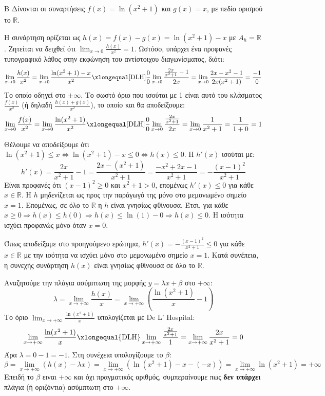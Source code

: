 \begin{thema}{Β}
Δίνονται οι συναρτήσεις $f(x) = \ln(x^2+1)$ και $g(x) = x$, με πεδίο ορισμού το $\mathbb{R}$.
\begin{erwthma}
\item Η συνάρτηση ορίζεται ως $h(x) = f(x) - g(x) = \ln(x^2+1) - x$ με $A_h = \mathbb{R}$.
Ζητείται να δειχθεί ότι $\lim_{x\to0} \frac{h(x)}{x^2} = 1$. Ωστόσο, υπάρχει ένα προφανές τυπογραφικό λάθος στην εκφώνηση του αντίστοιχου διαγωνίσματος, διότι:
\[ \lim_{x\to0} \frac{h(x)}{x^2} = \lim_{x\to0} \frac{\ln(x^2+1) - x}{x^2} \xlongequal[\text{DLH}]{\frac{0}{0}} \lim_{x\to0} \frac{\frac{2x}{x^2+1} - 1}{2x} = \lim_{x\to0} \frac{2x - x^2 - 1}{2x(x^2+1)} = \frac{-1}{0} \]
Το οποίο οδηγεί στο $\pm\infty$. Το σωστό όριο που ισούται με 1 είναι αυτό του κλάσματος $\frac{f(x)}{x^2}$ (ή δηλαδή $\frac{h(x)+g(x)}{x^2}$), το οποίο και θα αποδείξουμε:
\[ \lim_{x \to 0} \frac{f(x)}{x^2} = \lim_{x \to 0} \frac{\ln(x^2+1)}{x^2} \xlongequal[\text{DLH}]{\frac{0}{0}} \lim_{x \to 0} \frac{\frac{2x}{x^2+1}}{2x} = \lim_{x \to 0} \frac{1}{x^2+1} = \frac{1}{1+0} = 1 \]

\item Θέλουμε να αποδείξουμε ότι $\ln(x^2+1) \le x \Leftrightarrow \ln(x^2+1) - x \le 0 \Leftrightarrow h(x) \le 0$.
Η $h'(x)$ ισούται με:
\[ h'(x) = \frac{2x}{x^2+1} - 1 = \frac{2x - (x^2+1)}{x^2+1} = \frac{-x^2+2x-1}{x^2+1} = -\frac{(x-1)^2}{x^2+1} \]
Είναι προφανές ότι $(x-1)^2 \ge 0$ και $x^2+1 > 0$, επομένως $h'(x) \le 0$ για κάθε $x \in \mathbb{R}$. Η $h$ μηδενίζεται ως προς την παράγωγό της μόνο στο μεμονωμένο σημείο $x=1$. Επομένως, σε όλο το $\mathbb{R}$ η $h$ είναι γνησίως φθίνουσα.
Έτσι, για κάθε $x \ge 0 \Rightarrow h(x) \le h(0) \Rightarrow h(x) \le \ln(1)-0 \Rightarrow h(x) \le 0$.
Η ισότητα ισχύει προφανώς μόνο όταν $x = 0$.

\item Όπως αποδείξαμε στο προηγούμενο ερώτημα, $h'(x) = -\frac{(x-1)^2}{x^2+1} \le 0$ για κάθε $x \in \mathbb{R}$ με την ισότητα να ισχύει μόνο στο μεμονωμένο σημείο $x=1$. Κατά συνέπεια, η συνεχής συνάρτηση $h(x)$ είναι γνησίως φθίνουσα σε όλο το $\mathbb{R}$.

\item Αναζητούμε την πλάγια ασύμπτωτη της μορφής $y = \lambda x + \beta$ στο $+\infty$:
\[ \lambda = \lim_{x\to+\infty} \frac{h(x)}{x} = \lim_{x\to+\infty} \left( \frac{\ln(x^2+1)}{x} - 1 \right) \]
Το όριο $\lim_{x\to+\infty} \frac{\ln(x^2+1)}{x}$ υπολογίζεται με De L' Hospital:
\[ \lim_{x\to+\infty} \frac{\ln(x^2+1)}{x} \xlongequal{\text{DLH}} \lim_{x\to+\infty} \frac{\frac{2x}{x^2+1}}{1} = \lim_{x\to+\infty} \frac{2x}{x^2+1} = 0 \]
Άρα $\lambda = 0 - 1 = -1$.
Στη συνέχεια υπολογίζουμε το $\beta$:
\[ \beta = \lim_{x\to+\infty} (h(x) - \lambda x) = \lim_{x\to+\infty} (\ln(x^2+1) - x - (-x)) = \lim_{x\to+\infty} \ln(x^2+1) = +\infty \]
Επειδή το $\beta$ ειναι $+\infty$ και όχι πραγματικός αριθμός, συμπεραίνουμε πως \textbf{δεν υπάρχει} πλάγια (ή οριζόντια) ασύμπτωτη στο $+\infty$.
\end{erwthma}
\end{thema}

